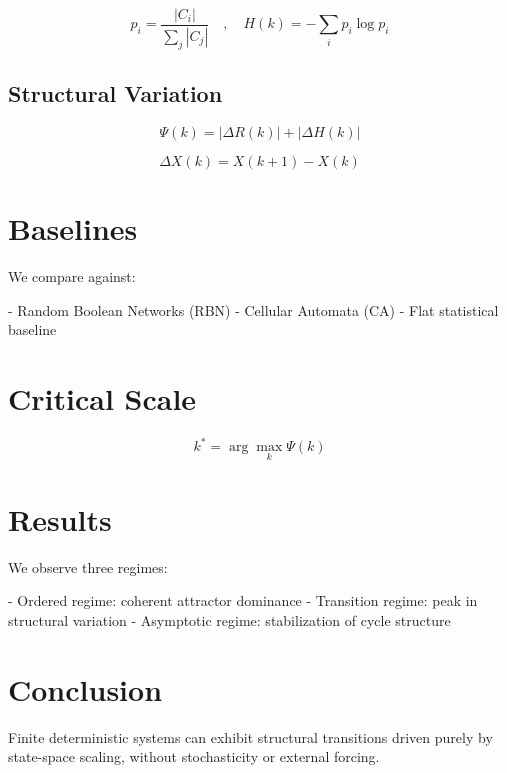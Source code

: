 \documentclass[11pt]{article}
\begin{document}
\[
p_i = \frac{|C_i|}{\sum_j |C_j|}
\quad,\quad
H(k) = -\sum_i p_i \log p_i
\]

\subsection{Structural Variation}

\[
\Psi(k) = |\Delta R(k)| + |\Delta H(k)|
\]

\[
\Delta X(k) = X(k+1) - X(k)
\]

\section{Baselines}

We compare against:

- Random Boolean Networks (RBN)
- Cellular Automata (CA)
- Flat statistical baseline

\section{Critical Scale}

\[
k^* = \arg\max_k \Psi(k)
\]

\section{Results}

We observe three regimes:

- Ordered regime: coherent attractor dominance
- Transition regime: peak in structural variation
- Asymptotic regime: stabilization of cycle structure

\section{Conclusion}

Finite deterministic systems can exhibit structural transitions driven purely by state-space scaling, without stochasticity or external forcing.
\end{document}
